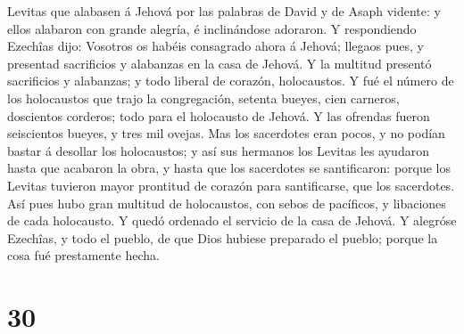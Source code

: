 Levitas que alabasen á Jehová por las palabras de David y de Asaph
vidente: y ellos alabaron con grande alegría, é inclinándose adoraron.
 Y respondiendo Ezechîas dijo: Vosotros os habéis
consagrado ahora á Jehová; llegaos pues, y presentad sacrificios y
alabanzas en la casa de Jehová. Y la multitud presentó sacrificios y
alabanzas; y todo liberal de corazón, holocaustos.  Y fué
el número de los holocaustos que trajo la congregación, setenta bueyes,
cien carneros, doscientos corderos; todo para el holocausto de Jehová.
 Y las ofrendas fueron seiscientos bueyes, y tres mil
ovejas.  Mas los sacerdotes eran pocos, y no podían
bastar á desollar los holocaustos; y así sus hermanos los Levitas les
ayudaron hasta que acabaron la obra, y hasta que los sacerdotes se
santificaron: porque los Levitas tuvieron mayor prontitud de corazón
para santificarse, que los sacerdotes.  Así pues hubo
gran multitud de holocaustos, con sebos de pacíficos, y libaciones de
cada holocausto. Y quedó ordenado el servicio de la casa de Jehová.
 Y alegróse Ezechîas, y todo el pueblo, de que Dios
hubiese preparado el pueblo; porque la cosa fué prestamente hecha.

\hypertarget{section-29}{%
\section{30}\label{section-29}}

